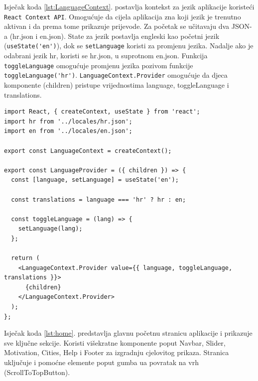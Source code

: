 \documentclass[]{foi}
\begin{document}
Isječak koda \ref{lst:LanguageContext}. postavlja kontekst za jezik aplikacije koristeći \verb|React Context API|. Omogućuje da cijela aplikacija zna koji jezik je trenutno
aktivan i da prema tome prikazuje prijevode. Za početak se učitavaju dva JSON-a (hr.json i en.json). State za jezik postavlja engleski kao početni
jezik (\verb|useState('en')|), dok se \verb|setLanguage| koristi za promjenu jezika. Nadalje ako je odabrani jezik hr, koristi se hr.json, u suprotnom en.json.
Funkcija \verb|toggleLanguage| omogućuje promjenu jezika pozivom funkcije \verb|toggleLanguage('hr')|. \verb|LanguageContext.Provider| omogućuje da djeca komponente
({children}) pristupe vrijednostima language, toggleLanguage i translations.

\begin{longlisting}
\begin{verbatim}
import React, { createContext, useState } from 'react';
import hr from '../locales/hr.json';
import en from '../locales/en.json';

export const LanguageContext = createContext();

export const LanguageProvider = ({ children }) => {
  const [language, setLanguage] = useState('en');

  const translations = language === 'hr' ? hr : en;

  const toggleLanguage = (lang) => {
    setLanguage(lang);
  };

  return (
    <LanguageContext.Provider value={{ language, toggleLanguage, translations }}>
      {children}
    </LanguageContext.Provider>
  );
};
\end{verbatim}
\caption{LanguageContext.jsx}
\label{lst:LanguageContext}
\end{longlisting}

Isječak koda \ref{lst:home}. predstavlja glavnu početnu stranicu aplikacije i prikazuje sve ključne sekcije. Koristi višekratne komponente poput Navbar,
Slider, Motivation, Cities, Help i Footer za izgradnju cjelovitog prikaza. Stranica uključuje i pomoćne elemente poput gumba ua povratak na vrh
(ScrollToTopButton).
\end{document}
